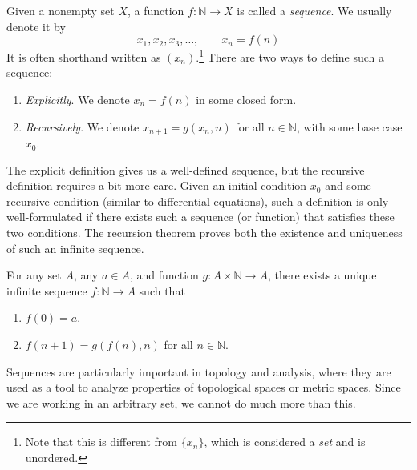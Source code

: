   \begin{definition}[Sequence]
    \label{def:sequence}
    Given a nonempty set $X$, a function $f: \mathbb{N} \rightarrow X$ is called a \textit{sequence}. We usually denote it by 
    \begin{equation}
      x_1, x_2, x_3, \ldots, \qquad x_n = f(n)
    \end{equation}
    It is often shorthand written as $(x_n)$.\footnote{Note that this is different from $\{x_n\}$, which is considered a \textit{set} and is unordered.} There are two ways to define such a sequence: 
    \begin{enumerate}
      \item \textit{Explicitly}. We denote $x_n = f(n)$ in some closed form. 
      \item \textit{Recursively}. We denote $x_{n+1} = g(x_n, n)$ for all $n \in \mathbb{N}$, with some base case $x_0$. 
    \end{enumerate}
  \end{definition}

  The explicit definition gives us a well-defined sequence, but the recursive definition requires a bit more care. Given an initial condition $x_0$ and some recursive condition (similar to differential equations), such a definition is only well-formulated if there exists such a sequence (or function) that satisfies these two conditions. The recursion theorem proves both the existence and uniqueness of such an infinite sequence. 

  \begin{theorem}
    \label{thm:recursion-theorem}
    For any set $A$, any $a \in A$, and function $g: A \times \mathbb{N} \to A$, there exists a unique infinite sequence $f: \mathbb{N} \to A$ such that 
    \begin{enumerate}
      \item $f(0) = a$. 
      \item $f(n+1) = g(f(n), n)$ for all $n \in \mathbb{N}$. 
    \end{enumerate}
  \end{theorem}

  Sequences are particularly important in topology and analysis, where they are used as a tool to analyze properties of topological spaces or metric spaces. Since we are working in an arbitrary set, we cannot do much more than this.   

